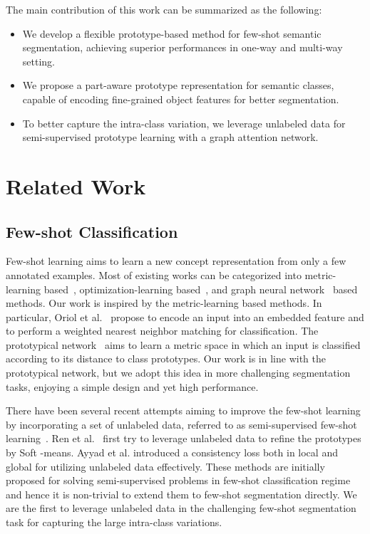 \documentclass[runningheads]{llncs}
\begin{document}
The main contribution of this work can be summarized as the following:
\begin{itemize}
	\item We develop a flexible prototype-based method for few-shot semantic segmentation, achieving superior performances in one-way and multi-way setting.
	\item We propose a part-aware prototype representation for semantic classes, capable of encoding fine-grained object features for better segmentation.
	\item To better capture the intra-class variation, we leverage unlabeled data for semi-supervised prototype learning with a graph attention network. 
\end{itemize}

\section{Related Work}

\subsection{Few-shot Classification}
Few-shot learning aims to learn a new concept representation from only a few annotated examples. Most of existing works can be categorized into metric-learning based~\cite{yan2019dual,snell2017prototypical,vinyals2016matching}, optimization-learning based~\cite{ravi2016optimization,finn2017model}, and graph neural network~\cite{garcia2017few,liu2018learning} based methods. Our work is inspired by the metric-learning based methods. In particular, Oriol et al.~\cite{vinyals2016matching} propose to encode an input into an embedded feature and to perform a weighted nearest neighbor matching for classification. The prototypical network~\cite{snell2017prototypical} aims to learn a metric space in which an input is classified according to its distance to class prototypes. Our work is in line with the prototypical network, but we adopt this idea in more challenging segmentation tasks, enjoying a simple design and yet high performance.

There have been several recent attempts aiming to improve the few-shot learning by incorporating a set of unlabeled data, referred to as semi-supervised few-shot learning~\cite{ren2018meta,li2019learning,ayyad2019semi}. Ren et al.~\cite{ren2018meta} first try to leverage unlabeled data to refine the prototypes by Soft -means. Ayyad et al.\cite{ayyad2019semi} introduced a consistency loss both in local and global for utilizing unlabeled data effectively. These methods are initially proposed for solving semi-supervised problems in few-shot classification regime and hence it is non-trivial to extend them to few-shot segmentation directly. We are the first to leverage unlabeled data in the challenging few-shot segmentation task for capturing the large intra-class variations. 
\end{document}
